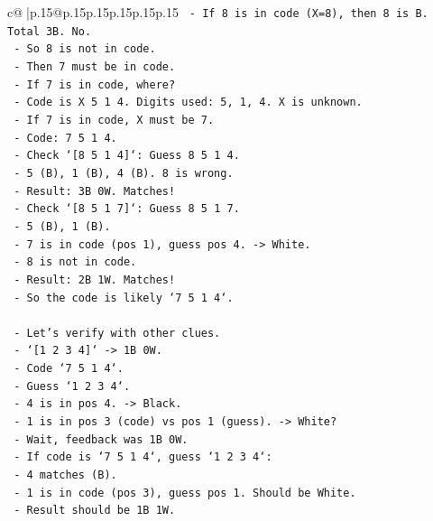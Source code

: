 \documentclass{article}
\begin{document}
{\begin{supertabular}{c@{$\;$}|p{.15\linewidth}@{}p{.15\linewidth}p{.15\linewidth}p{.15\linewidth}p{.15\linewidth}p{.15\linewidth}}
{{{\texttt{          {-} If 8 is in code (X=8), then 8 is B. Total 3B. No.} \\
\texttt{          {-} So 8 is not in code.} \\
\texttt{          {-} Then 7 must be in code.} \\
\texttt{          {-} If 7 is in code, where?} \\
\texttt{          {-} Code is X 5 1 4. Digits used: 5, 1, 4. X is unknown.} \\
\texttt{          {-} If 7 is in code, X must be 7.} \\
\texttt{          {-} Code: 7 5 1 4.} \\
\texttt{          {-} Check `{[}8 5 1 4{]}`: Guess 8 5 1 4.} \\
\texttt{            {-} 5 (B), 1 (B), 4 (B). 8 is wrong.} \\
\texttt{            {-} Result: 3B 0W. Matches!} \\
\texttt{          {-} Check `{[}8 5 1 7{]}`: Guess 8 5 1 7.} \\
\texttt{            {-} 5 (B), 1 (B).} \\
\texttt{            {-} 7 is in code (pos 1), guess pos 4. {-}> White.} \\
\texttt{            {-} 8 is not in code.} \\
\texttt{            {-} Result: 2B 1W. Matches!} \\
\texttt{          {-} So the code is likely `7 5 1 4`.} \\
\\ 
\texttt{    {-} Let's verify with other clues.} \\
\texttt{    {-} `{[}1 2 3 4{]}` {-}> 1B 0W.} \\
\texttt{      {-} Code `7 5 1 4`.} \\
\texttt{      {-} Guess `1 2 3 4`.} \\
\texttt{      {-} 4 is in pos 4. {-}> Black.} \\
\texttt{      {-} 1 is in pos 3 (code) vs pos 1 (guess). {-}> White?} \\
\texttt{      {-} Wait, feedback was 1B 0W.} \\
\texttt{      {-} If code is `7 5 1 4`, guess `1 2 3 4`:} \\
\texttt{        {-} 4 matches (B).} \\
\texttt{        {-} 1 is in code (pos 3), guess pos 1. Should be White.} \\
\texttt{        {-} Result should be 1B 1W.} \\
}}}
\end{supertabular}}
\end{document}

